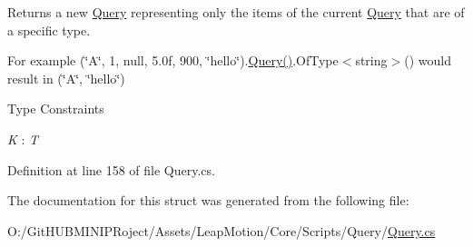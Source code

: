 Returns a new \mbox{\hyperlink{struct_leap_1_1_unity_1_1_query_1_1_query}{Query}} representing only the items of the current \mbox{\hyperlink{struct_leap_1_1_unity_1_1_query_1_1_query}{Query}} that are of a specific type. 

For example (\char`\"{}\+A\char`\"{}, 1, null, 5.\+0f, 900, \char`\"{}hello\char`\"{}).\mbox{\hyperlink{struct_leap_1_1_unity_1_1_query_1_1_query_a045e15022385ac33bf7ea2448de59f93}{Query()}}.Of\+Type$<$string$>$() would result in (\char`\"{}\+A\char`\"{}, \char`\"{}hello\char`\"{}) \begin{Desc}
\item[Type Constraints]\begin{description}
\item[{\em K} : {\em T}]\end{description}
\end{Desc}


Definition at line 158 of file Query.\+cs.



The documentation for this struct was generated from the following file\+:\begin{DoxyCompactItemize}
\item 
O\+:/\+Git\+H\+U\+B\+M\+I\+N\+I\+P\+Roject/\+Assets/\+Leap\+Motion/\+Core/\+Scripts/\+Query/\mbox{\hyperlink{_query_8cs}{Query.\+cs}}\end{DoxyCompactItemize}

